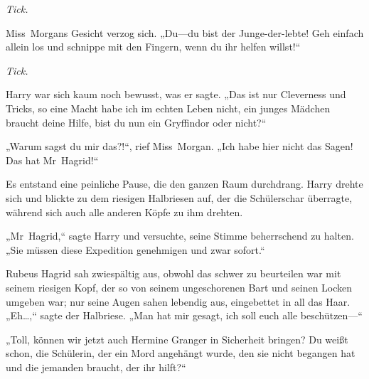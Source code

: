 \emph{Tick.}

Miss~Morgans Gesicht verzog sich.
„Du—du bist der Junge-der-lebte! Geh einfach allein los und schnippe mit den Fingern, wenn du ihr helfen willst!“

\emph{Tick.}

Harry war sich kaum noch bewusst, was er sagte.
„Das ist nur Cleverness und Tricks, so eine Macht habe ich im echten Leben nicht, ein junges Mädchen braucht deine Hilfe, bist du nun ein Gryffindor oder nicht?“

„Warum sagst du mir das?!“, rief Miss~Morgan. „Ich habe hier nicht das Sagen! Das hat Mr~Hagrid!“


Es entstand eine peinliche Pause, die den ganzen Raum durchdrang. Harry drehte sich und blickte zu dem riesigen Halbriesen auf, der die Schülerschar überragte, während sich auch alle anderen Köpfe zu ihm drehten.

„Mr~Hagrid,“ sagte Harry und versuchte, seine Stimme beherrschend zu halten. „Sie müssen diese Expedition genehmigen und zwar sofort.“

Rubeus Hagrid sah zwiespältig aus, obwohl das schwer zu beurteilen war mit seinem riesigen Kopf, der so von seinem ungeschorenen Bart und seinen Locken umgeben war; nur seine Augen sahen lebendig aus, eingebettet in all das Haar.
„Eh…,“ sagte der Halbriese. „Man hat mir gesagt, ich soll euch alle beschützen—“

„Toll, können wir jetzt auch Hermine Granger in Sicherheit bringen? Du weißt schon, die Schülerin, der ein Mord angehängt wurde, den sie nicht begangen hat und die jemanden braucht, der ihr hilft?“

